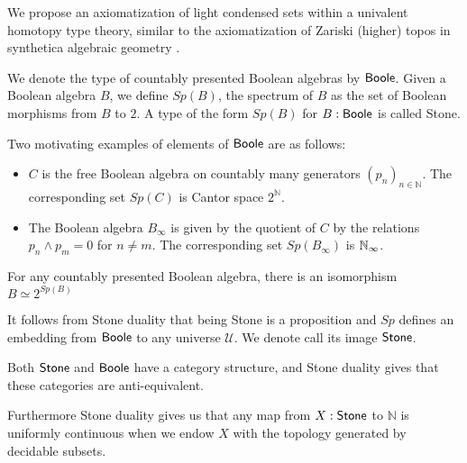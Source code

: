 We propose an axiomatization of light condensed sets \cite{Scholze}
within a univalent homotopy type theory, 
similar to the axiomatization of Zariski (higher) topos in synthetica algebraic geometry 
\cite{draft}. 

\medskip

We denote the type of countably presented Boolean algebras by $\mathsf{Boole}$.
Given a Boolean algebra $B$, we define $Sp(B)$, the spectrum of $B$ as the set of 
Boolean morphisms from $B$ to $2$. 
 A type of the form $Sp(B)$ for $B:\mathsf{Boole}$ is called Stone.


 Two motivating examples of elements of $\mathsf{Boole}$ are as follows:
 \begin{itemize}
   \item $C$ is the free Boolean algebra on countably many generators $(p_n)_{n\in\mathbb N}$. 
     The corresponding set $Sp(C)$ is Cantor space $2^\mathbb N$. 
   \item The Boolean algebra $ B_\infty$ is given by the quotient of $C$ by the relations $p_n\wedge p_m = 0$ for $n\neq m$. 
 The corresponding set $Sp(B_\infty)$ is $\mathbb{N}_{\infty}$. 
  \end{itemize} 

\begin{axiom}
  For any countably presented Boolean algebra, there is an isomorphism $B \simeq 2^{Sp(B)}$
\end{axiom}
It follows from Stone duality that being Stone is a proposition and $Sp$ defines an embedding from $\mathsf{Boole}$ 
to any universe $\mathcal U$. We denote call its image $\mathsf{Stone}$. 

Both $\mathsf{Stone}$ and $\mathsf{Boole}$ have a category structure, and 
Stone duality gives that these categories are anti-equivalent. 

Furthermore Stone duality gives us that any map from $X:\mathsf{Stone}$ to $\mathbb N$ is uniformly continuous
when we endow $X$ with the topology generated by decidable subsets. 

